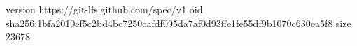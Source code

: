 version https://git-lfs.github.com/spec/v1
oid sha256:1bfa2010ef5c2bd4bc7250cafdf095da7af0d93ffe1fe55df9b1070c630ea5f8
size 23678

